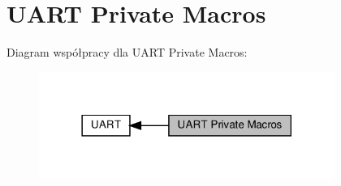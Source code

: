 \hypertarget{group___u_a_r_t___private___macros}{}\section{U\+A\+RT Private Macros}
\label{group___u_a_r_t___private___macros}
Diagram współpracy dla U\+A\+RT Private Macros\+:\nopagebreak
\begin{figure}[H]
\begin{center}
\leavevmode
\includegraphics[width=273pt]{group___u_a_r_t___private___macros}
\end{center}
\end{figure}
